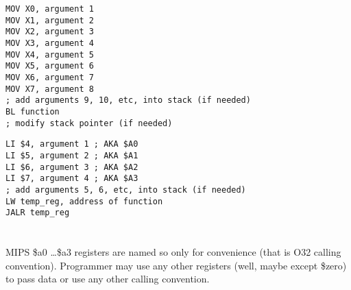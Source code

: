 \begin{lstlisting}[caption=ARM64]
MOV X0, argument 1
MOV X1, argument 2
MOV X2, argument 3
MOV X3, argument 4
MOV X4, argument 5
MOV X5, argument 6
MOV X6, argument 7
MOV X7, argument 8
; add arguments 9, 10, etc, into stack (if needed)
BL function
; modify stack pointer (if needed)
\end{lstlisting}
\fi

\ifdefined\IncludeMIPS
{}
\begin{lstlisting}[caption=MIPS (O32 calling convention)]
LI $4, argument 1 ; AKA $A0
LI $5, argument 2 ; AKA $A1
LI $6, argument 3 ; AKA $A2
LI $7, argument 4 ; AKA $A3
; add arguments 5, 6, etc, into stack (if needed)
LW temp_reg, address of function
JALR temp_reg
\end{lstlisting}
\fi

\section{}


\ifx\RUSSIAN\undefined
\ifdefined\IncludeMIPS
{}
MIPS \$a0 \dots \$a3 registers are named so only for convenience (that is O32 calling convention).
Programmer may use any other registers (well, maybe except \$zero) to pass data or use any other calling convention.
\fi
\fi
